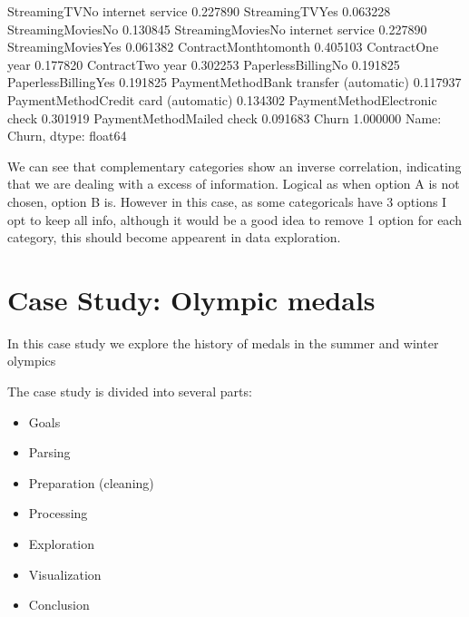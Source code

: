 \documentclass[letterpaper,10pt,english]{jupyterBook}
\begin{document}
\begin{sphinxVerbatim}[commandchars=\\\{\}]
StreamingTV\PYGZus{}No internet service           \PYGZhy{}0.227890
StreamingTV\PYGZus{}Yes                            0.063228
StreamingMovies\PYGZus{}No                         0.130845
StreamingMovies\PYGZus{}No internet service       \PYGZhy{}0.227890
StreamingMovies\PYGZus{}Yes                        0.061382
Contract\PYGZus{}Month\PYGZhy{}to\PYGZhy{}month                    0.405103
Contract\PYGZus{}One year                         \PYGZhy{}0.177820
Contract\PYGZus{}Two year                         \PYGZhy{}0.302253
PaperlessBilling\PYGZus{}No                       \PYGZhy{}0.191825
PaperlessBilling\PYGZus{}Yes                       0.191825
PaymentMethod\PYGZus{}Bank transfer (automatic)   \PYGZhy{}0.117937
PaymentMethod\PYGZus{}Credit card (automatic)     \PYGZhy{}0.134302
PaymentMethod\PYGZus{}Electronic check             0.301919
PaymentMethod\PYGZus{}Mailed check                \PYGZhy{}0.091683
Churn                                      1.000000
Name: Churn, dtype: float64
\end{sphinxVerbatim}

\sphinxAtStartPar
We can see that complementary categories show an inverse correlation, indicating that we are dealing with a excess of information.
Logical as when option A is not chosen, option B is.
However in this case, as some categoricals have 3 options I opt to keep all info, although it would be a good idea to remove 1 option for each category, this should become appearent in data exploration.


\chapter{Case Study: Olympic medals}
\label{\detokenize{c7_case_studies/Olympics:case-study-olympic-medals}}\label{\detokenize{c7_case_studies/Olympics::doc}}
\sphinxAtStartPar
In this case study we explore the history of medals in the summer and winter olympics

\sphinxAtStartPar
The case study is divided into several parts:
\begin{itemize}
\item {} 
\sphinxAtStartPar
Goals

\item {} 
\sphinxAtStartPar
Parsing

\item {} 
\sphinxAtStartPar
Preparation (cleaning)

\item {} 
\sphinxAtStartPar
Processing

\item {} 
\sphinxAtStartPar
Exploration

\item {} 
\sphinxAtStartPar
Visualization

\item {} 
\sphinxAtStartPar
Conclusion

\end{itemize}
\end{document}
